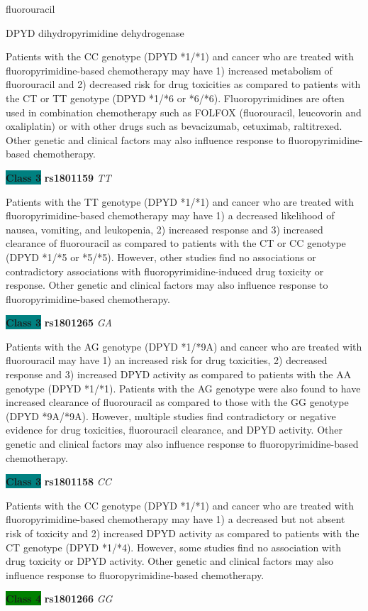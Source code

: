 \documentclass{resume} %
\begin{document}
\begin{rSection}{ fluorouracil }
\begin{rSubsection}{ DPYD }{ dihydropyrimidine dehydrogenase }{}{}
\item[] Patients with the CC genotype (DPYD *1/*1) and cancer who are treated with fluoropyrimidine-based chemotherapy may have 1) increased metabolism of fluorouracil and 2) decreased risk for drug toxicities as compared to patients with the CT or TT genotype (DPYD *1/*6 or *6/*6). Fluoropyrimidines are often used in combination chemotherapy such as FOLFOX (fluorouracil, leucovorin and oxaliplatin) or with other drugs such as bevacizumab, cetuximab, raltitrexed. Other genetic and clinical factors may also influence response to fluoropyrimidine-based chemotherapy.\item \textbf{\colorbox{teal} {Class 3}} \textbf{ rs1801159 } \textit{ TT }
\item[] Patients with the TT genotype (DPYD *1/*1) and cancer who are treated with fluoropyrimidine-based chemotherapy may have 1) a decreased likelihood of nausea, vomiting, and leukopenia, 2) increased response and 3) increased clearance of fluorouracil as compared to patients with the CT or CC genotype (DPYD *1/*5 or *5/*5). However, other studies find no associations or contradictory associations with fluoropyrimidine-induced drug toxicity or response. Other genetic and clinical factors may also influence response to fluoropyrimidine-based chemotherapy.\item \textbf{\colorbox{teal} {Class 3}} \textbf{ rs1801265 } \textit{ GA }
\item[] Patients with the AG genotype (DPYD *1/*9A) and cancer who are treated with fluorouracil may have 1) an increased risk for drug toxicities, 2) decreased response and 3) increased DPYD activity as compared to patients with the AA genotype (DPYD *1/*1). Patients with the AG genotype were also found to have increased clearance of fluorouracil as compared to those with the GG genotype (DPYD *9A/*9A). However, multiple studies find contradictory or negative evidence for drug toxicities, fluorouracil clearance, and DPYD activity. Other genetic and clinical factors may also influence response to fluoropyrimidine-based chemotherapy.\item \textbf{\colorbox{teal} {Class 3}} \textbf{ rs1801158 } \textit{ CC }
\item[] Patients with the CC genotype (DPYD *1/*1) and cancer who are treated with fluoropyrimidine-based chemotherapy may have 1) a decreased but not absent risk of toxicity and 2) increased DPYD activity as compared to patients with the CT genotype (DPYD *1/*4). However, some studies find no association with drug toxicity or DPYD activity. Other genetic and clinical factors may also influence response to fluoropyrimidine-based chemotherapy.\item \textbf{\colorbox{green} {Class 4}} \textbf{ rs1801266 } \textit{ GG }

\end{rSubsection}
\end{rSection}
\end{document}
